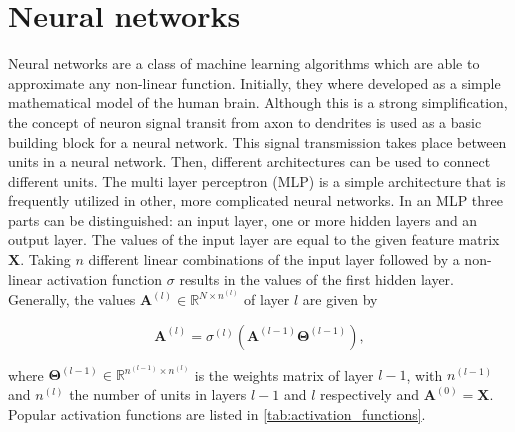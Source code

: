 \section{Neural networks}


Neural networks are a class of machine learning algorithms which are able to
approximate any non-linear function.\cite{cybenko1989approximation} Initially, they where developed as
a simple mathematical model of the human brain.\cite{rosenblatt1962principles} Although this is a strong
simplification, the concept of neuron signal transit from axon to dendrites
is used as a basic building block for a neural network.\cite{wang2017origin} This signal transmission
takes place between units in a neural network. Then, different architectures
can be used to connect different units. The multi layer perceptron (MLP) is a simple
architecture that is frequently utilized in other, more complicated neural networks.\cite{almeida2020multilayer}
In an MLP three parts can be distinguished: an input layer, one or more hidden layers
and an output layer. The values of the input layer are equal to the given feature matrix
$\pmb{X}$. Taking $n$ different linear combinations of the input layer followed by
a non-linear activation function $\sigma$ results in the values of the first hidden
layer. Generally, the values $\pmb{A}^{(l)} \in \mathbb{R}^{N \times n^{(l)}}$ of layer
$l$ are given by


\begin{equation}
	\pmb{A}^{(l)} =  \sigma^{(l)} \left(\pmb{A}^{(l-1)}\pmb{\Theta}^{(l-1)} \right),
\end{equation}


where $\pmb{\Theta}^{(l-1)} \in \mathbb{R}^{n^{(l-1)} \times n^{(l)}}$ is the weights matrix
of layer $l - 1$, with $n^{(l-1)}$ and $n^{(l)}$ the number of units in layers
$l-1$ and $l$ respectively and $\pmb{A}^{(0)} = \pmb{X}$. Popular activation
functions are listed in \cref{tab:activation_functions}.

